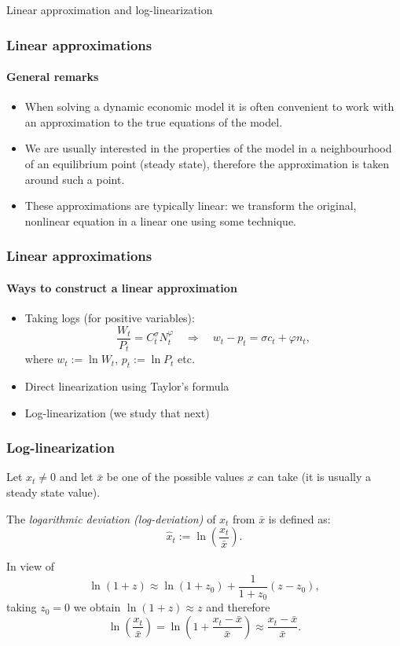 \documentclass[10pt]{beamer}
\theoremstyle{definition}
\begin{document}
\begin{section}{Linear approximation and log-linearization}\label{sec:llin}

\begin{frame}
\frametitle{Linear approximations}
\framesubtitle{General remarks}
\begin{itemize}\itemsep1em
\item When solving a dynamic economic model it is often convenient to work with an approximation to the true equations of the model.
\item We are usually interested in the properties of the model in a neighbourhood of an equilibrium point (steady state), therefore the approximation is taken around such a point. 
\item These approximations are typically linear: we transform the original, nonlinear equation in a linear one using some technique.
\end{itemize}
\end{frame}


\begin{frame}
\frametitle{Linear approximations}
\framesubtitle{Ways to construct a linear approximation}
\begin{itemize}\itemsep1em
\item Taking logs (for positive variables):
\[ \frac{W_t}{P_t} = C_t^\sigma N_t^\varphi \quad\Longrightarrow\quad w_t - p_t = \sigma c_t + \varphi n_t, \] where $ w_t := \ln W_t $, $ p_t := \ln P_t $ etc. 
\item Direct linearization using Taylor's formula 
\item Log-linearization (we study that next)
\end{itemize}
\end{frame}




\begin{frame} \frametitle{Log-linearization}
Let $x_t \neq 0$ and let $\bar{x}$ be one of the possible values $x$ can take (it is usually a steady state value).

The \emph{logarithmic deviation (log-deviation)} of $x_t$ from $\bar{x}$ is defined as: $$\hat{x}_t := \ln \left(\frac{x_t}{\bar{x}}\right).$$

In view of $$\ln (1+z)\approx \ln (1+z_0)+ \frac{1}{1+z_0}(z-z_0),$$ taking $z_0=0$ we obtain $\ln (1+z) \approx z$ and therefore $$\ln \left(\frac{x_t}{\bar{x}}\right) = \ln \left(1+\frac{x_t-\bar{x}}{\bar{x}}\right)\approx \frac{x_t-\bar{x}}{\bar{x}}. $$
\end{frame}


\end{section}
\end{document}
